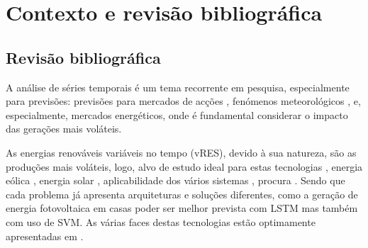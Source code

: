 \chapter{Contexto e revisão bibliográfica}
\section{Revisão bibliográfica}

A análise de séries temporais é um tema recorrente em pesquisa, especialmente para previsões: previsões para mercados de acções \cite{Bhandari2022}, fenómenos meteorológicos \cite{Wang2019}, e, especialmente, mercados energéticos, onde é fundamental considerar o impacto das gerações mais voláteis.\par
As energias renováveis variáveis no tempo (\gls{vRES}), devido à sua natureza, são as produções mais voláteis, logo, alvo de estudo ideal para estas tecnologias \cite{Lu2015}, energia eólica \cite{Sun2022}, energia solar \cite{Rajasundrapandiyanleebanon2023}, aplicabilidade dos vários sistemas \cite{Ahmad2020}, procura \cite{Antonopoulos2020}.
Sendo que cada problema já apresenta arquiteturas e soluções diferentes, como a geração de energia fotovoltaica em casas poder ser melhor prevista com \gls{LSTM}\cite{Costa2022} mas também com uso de \gls{SVM}\cite{Meenal2018}. As várias faces destas tecnologias estão optimamente apresentadas em \cite{Benti2023}.\par


